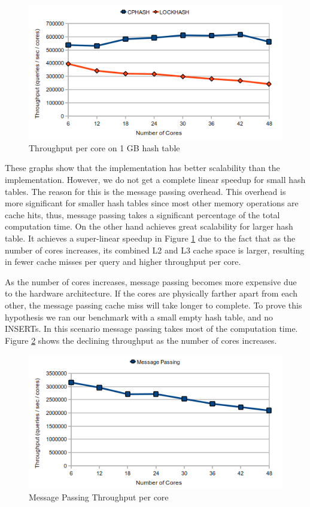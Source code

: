 \begin{figure}[!ht]
  \centering
  \includegraphics[width=\linewidth]{figs/scale1gb.png}
  \caption{Throughput per core on 1 GB hash table}
  \label{fig:scale1gb}
\end{figure}

These graphs show that the \cphash{} implementation has better scalability than the \lockhash{} implementation. However, we do not 
get a complete linear speedup for small hash tables. The reason for this is the message passing overhead. This overhead is more significant for smaller 
hash tables since most other memory operations are cache hits, thus, message passing takes a significant percentage of the total computation time. On
the other hand \cphash{} achieves great scalability for larger hash table. It achieves a super-linear speedup in Figure \ref{fig:scale1gb} due to the fact that
as the number of cores increases, its combined L2 and L3 cache space is larger, resulting in fewer cache misses per query and higher throughput per core. 

As the number of cores increases, message passing becomes more expensive due to the hardware architecture. If the cores are physically farther apart from each 
other, the message passing cache miss will take longer to complete. To prove this hypothesis we ran our benchmark with a small empty hash table, and no INSERTs. 
In this scenario message passing takes most of the computation time. Figure \ref{fig:scalemp} shows the declining throughput as the number of cores increases.

\begin{figure}[!ht]
  \centering
  \includegraphics[width=\linewidth]{figs/scalemp.png}
  \caption{Message Passing Throughput per core}
  \label{fig:scalemp}
\end{figure}

